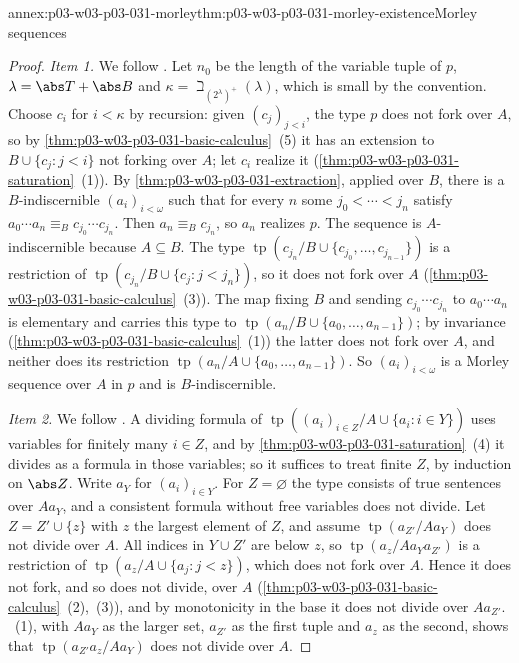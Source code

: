 \begin{annexitem}{annex:p03-w03-p03-031-morley}{thm:p03-w03-p03-031-morley-existence}{Morley sequences}
\begin{proof}
\emph{Item 1.}  We follow \cite[Lemma~5.1, p.~272]{Casanovas2007Simplicity}.
Let \(n_0\) be the length of the variable tuple of \(p\),
\(\lambda=\abs T+\abs B\) and \(\kappa=\beth_{(2^\lambda)^+}(\lambda)\),
which is small by the convention.  Choose \(c_i\) for \(i<\kappa\) by
recursion: given \((c_j)_{j<i}\), the type \(p\) does not fork over \(A\),
so by \cref{thm:p03-w03-p03-031-basic-calculus}~(5) it has an extension to
\(B\cup\{c_j:j<i\}\) not forking over \(A\); let \(c_i\) realize it
(\cref{thm:p03-w03-p03-031-saturation}~(1)).  By
\cref{thm:p03-w03-p03-031-extraction}, applied over \(B\), there is a
\(B\)-indiscernible \((a_i)_{i<\omega}\) such that for every \(n\) some
\(j_0<\cdots<j_n\) satisfy \(a_0\cdots a_n\equiv_Bc_{j_0}\cdots c_{j_n}\).
Then \(a_n\equiv_Bc_{j_n}\), so \(a_n\) realizes \(p\).  The sequence is
\(A\)-indiscernible because \(A\subseteq B\).  The type
\(\operatorname{tp}(c_{j_n}/B\cup\{c_{j_0},\ldots,c_{j_{n-1}}\})\) is a
restriction of \(\operatorname{tp}(c_{j_n}/B\cup\{c_j:j<j_n\})\), so it does
not fork over \(A\) (\cref{thm:p03-w03-p03-031-basic-calculus}~(3)).  The
map fixing \(B\) and sending \(c_{j_0}\cdots c_{j_n}\) to \(a_0\cdots a_n\)
is elementary and carries this type to
\(\operatorname{tp}(a_n/B\cup\{a_0,\ldots,a_{n-1}\})\); by invariance
(\cref{thm:p03-w03-p03-031-basic-calculus}~(1)) the latter does not fork
over \(A\), and neither does its restriction
\(\operatorname{tp}(a_n/A\cup\{a_0,\ldots,a_{n-1}\})\).  So
\((a_i)_{i<\omega}\) is a Morley sequence over \(A\) in \(p\) and is
\(B\)-indiscernible.

\emph{Item 2.}  We follow \cite[Remark~5.2, p.~272]{Casanovas2007Simplicity}.
A dividing formula of
\(\operatorname{tp}((a_i)_{i\in Z}/A\cup\{a_i:i\in Y\})\) uses variables
for finitely many \(i\in Z\), and by
\cref{thm:p03-w03-p03-031-saturation}~(4) it divides as a formula in those
variables; so it suffices to treat finite \(Z\), by induction on
\(\abs Z\).  Write \(a_Y\) for \((a_i)_{i\in Y}\).  For \(Z=\varnothing\)
the type consists of true sentences over \(Aa_Y\), and a consistent formula
without free variables does not divide.  Let \(Z=Z'\cup\{z\}\) with \(z\)
the largest element of \(Z\), and assume
\(\operatorname{tp}(a_{Z'}/Aa_Y)\) does not divide over \(A\).  All indices
in \(Y\cup Z'\) are below \(z\), so
\(\operatorname{tp}(a_z/Aa_Ya_{Z'})\) is a restriction of
\(\operatorname{tp}(a_z/A\cup\{a_j:j<z\})\), which does not fork over
\(A\).  Hence it does not fork, and so does not divide, over \(A\)
(\cref{thm:p03-w03-p03-031-basic-calculus}~(2),~(3)), and by monotonicity
in the base it does not divide over \(Aa_{Z'}\).
~(1), with \(Aa_Y\) as the larger set,
\(a_{Z'}\) as the first tuple and \(a_z\) as the second, shows that
\(\operatorname{tp}(a_{Z'}a_z/Aa_Y)\) does not divide over \(A\).
\end{proof}
\end{annexitem}

